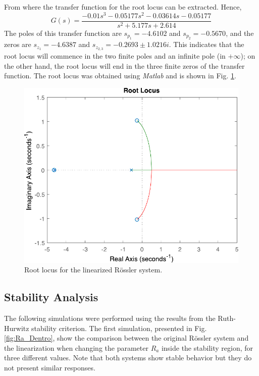 From where the transfer function for the root locus can be extracted. Hence,
\begin{equation}
    G(s)=\dfrac{-0.01 s^3 - 0.05177 s^2 - 0.03614 s - 0.05177}{ s^2 + 5.177 s + 2.614}
\end{equation}
The poles of this transfer function are $s_{p_1}= -4.6102$ and $s_{p_2}=-0.5670$, and the zeros are $s_{z_1}=-4.6387$ and $s_{z_{2,3}}=-0.2693 \pm 1.0216i$. This indicates that the root locus will commence in the two finite poles and an infinite pole (in $+\infty$); on the other hand, the root locus will end in the three finite zeros of the transfer function. The root locus was obtained using \textit{Matlab} and is shown in Fig. \ref{fig:root_locus}.
\begin{figure}[H]
    \centering
    \includegraphics[scale=0.5]{figs/root_locus.pdf}
    \caption{Root locus for the linearized Rössler system.}
    \label{fig:root_locus}
\end{figure}



\subsection{Stability Analysis}

The following simulations were performed using the results from the Ruth-Hurwitz stability criterion. The first simulation, presented in Fig. \ref{fig:Ra_Dentro}, show the comparison between the original Rössler system and the linearization when changing the parameter $R_a$ inside the stability region, for three different values. Note that both systems show stable behavior but they do not present similar responses.

